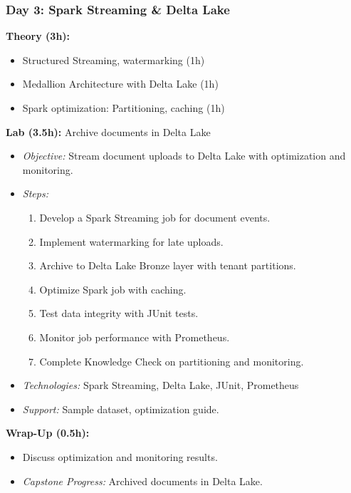 \documentclass[11pt]{article}
\begin{document}
\subsubsection{Day 3: Spark Streaming \& Delta Lake}
\textbf{Theory (3h):}
\begin{itemize}
    \item Structured Streaming, watermarking (1h)
    \item Medallion Architecture with Delta Lake (1h)
    \item Spark optimization: Partitioning, caching (1h)
\end{itemize}
\textbf{Lab (3.5h):} Archive documents in Delta Lake
\begin{itemize}
    \item \textit{Objective:} Stream document uploads to Delta Lake with optimization and monitoring.
    \item \textit{Steps:}
        \begin{enumerate}
            \item Develop a Spark Streaming job for document events.
            \item Implement watermarking for late uploads.
            \item Archive to Delta Lake Bronze layer with tenant partitions.
            \item Optimize Spark job with caching.
            \item Test data integrity with JUnit tests.
            \item Monitor job performance with Prometheus.
            \item Complete Knowledge Check on partitioning and monitoring.
        \end{enumerate}
    \item \textit{Technologies:} Spark Streaming, Delta Lake, JUnit, Prometheus
    \item \textit{Support:} Sample dataset, optimization guide.
\end{itemize}
\textbf{Wrap-Up (0.5h):}
\begin{itemize}
    \item Discuss optimization and monitoring results.
    \item \textit{Capstone Progress:} Archived documents in Delta Lake.
\end{itemize}
\end{document}
